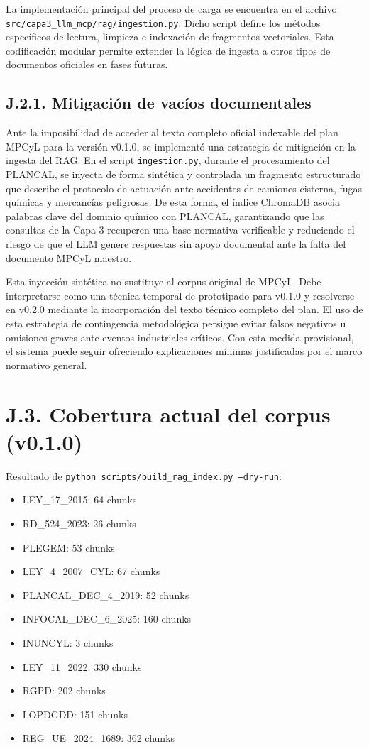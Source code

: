La implementación principal del proceso de carga se encuentra en el archivo \texttt{src/capa3\_llm\_mcp/rag/ingestion.py}. Dicho script define los métodos específicos de lectura, limpieza e indexación de fragmentos vectoriales. Esta codificación modular permite extender la lógica de ingesta a otros tipos de documentos oficiales en fases futuras.

\subsection*{J.2.1. Mitigación de vacíos documentales}

Ante la imposibilidad de acceder al texto completo oficial indexable del plan MPCyL
para la versión v0.1.0, se implementó una estrategia de mitigación en la ingesta del
RAG. En el script \texttt{ingestion.py}, durante el procesamiento del PLANCAL, se
inyecta de forma sintética y controlada un fragmento estructurado que describe el
protocolo de actuación ante accidentes de camiones cisterna, fugas químicas y
mercancías peligrosas. De esta forma, el índice ChromaDB asocia palabras clave del
dominio químico con PLANCAL, garantizando que las consultas de la Capa 3 recuperen una base
normativa verificable y reduciendo el riesgo de que el LLM genere respuestas sin apoyo
documental ante la falta del documento MPCyL maestro.

Esta inyección sintética no sustituye al corpus original de MPCyL. Debe interpretarse como una técnica temporal de prototipado para v0.1.0 y resolverse en v0.2.0 mediante la incorporación del texto técnico completo del plan. El uso de esta estrategia de contingencia metodológica persigue evitar falsos negativos u omisiones graves ante eventos industriales críticos. Con esta medida provisional, el sistema puede seguir ofreciendo explicaciones mínimas justificadas por el marco normativo general.

\section*{J.3. Cobertura actual del corpus (v0.1.0)}

Resultado de \texttt{python scripts/build\_rag\_index.py --dry-run}:

\begin{itemize}
    \item LEY\_17\_2015: 64 chunks
    \item RD\_524\_2023: 26 chunks
    \item PLEGEM: 53 chunks
    \item LEY\_4\_2007\_CYL: 67 chunks
    \item PLANCAL\_DEC\_4\_2019: 52 chunks
    \item INFOCAL\_DEC\_6\_2025: 160 chunks
    \item INUNCYL: 3 chunks
    \item LEY\_11\_2022: 330 chunks
    \item RGPD: 202 chunks
    \item LOPDGDD: 151 chunks
    \item REG\_UE\_2024\_1689: 362 chunks
\end{itemize}

